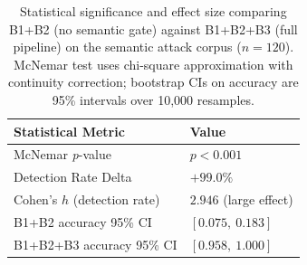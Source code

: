 \begin{table}[t]
\centering
\caption{Statistical significance and effect size comparing B1+B2 (no semantic gate)
         against B1+B2+B3 (full pipeline) on the semantic attack corpus
         ($n = 120$).
         McNemar test uses chi-square approximation with continuity correction;
         bootstrap CIs on accuracy are 95\% intervals over 10{,}000 resamples.}
\label{tab:semantic_stats}
\renewcommand{\arraystretch}{1.15}
\begin{tabular}{lp{5.2cm}}
\toprule
\textbf{Statistical Metric} & \textbf{Value} \\
\midrule
McNemar \textit{p}-value        & $p < 0.001$ \\
Detection Rate Delta            & $+99.0\%$ \\
Cohen's $h$ (detection rate)    & $2.946$ (large effect) \\
B1+B2 accuracy 95\% CI          & $[0.075,\ 0.183]$ \\
B1+B2+B3 accuracy 95\% CI       & $[0.958,\ 1.000]$ \\
\bottomrule
\end{tabular}
\end{table}
